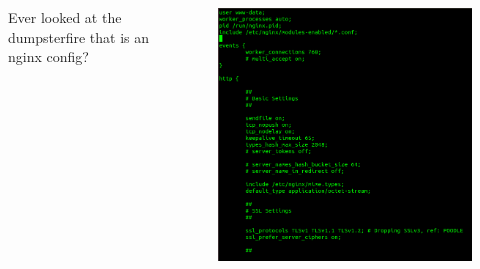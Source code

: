 \documentclass{beamer}
\begin{document}
\begin{frame}
    \begin{columns}
        \begin{column}{0.5\textwidth}
            Ever looked at the dumpsterfire that is an nginx config?
        \end{column}
        \begin{column}{0.5\textwidth}
            \begin{figure}
                \centering
                \includegraphics[width=\textwidth,keepaspectratio]{../resources/nginx_config.png}
            \end{figure}
        \end{column}
    \end{columns}
\end{frame}
\end{document}
